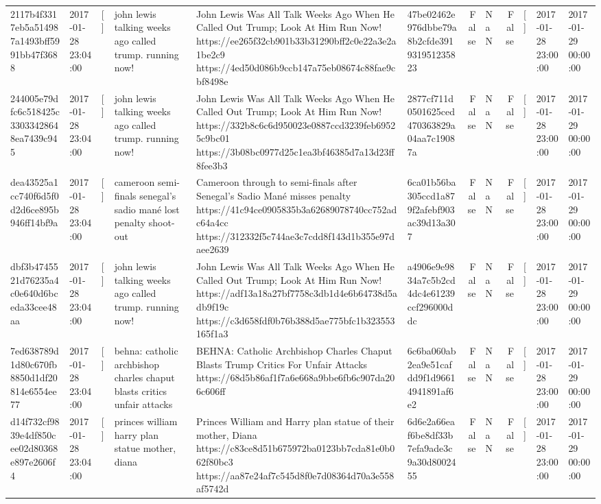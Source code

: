 \begin{tabular}{llllllrlrlll}
2117b4f3317eb5a514987a1493bff5991bb47f3688 & 2017-01-28 23:04:00 & [] & john lewis talking weeks ago called trump. running now! & John Lewis Was All Talk Weeks Ago When He Called Out Trump; Look At Him Run Now! https://ee265f32cb901b33b31290bff2c0e22a3e2a1be2c9 https://4ed50d086b9ccb147a75eb08674c88fae9cbf8498e & 47be02462e976dbbe79a8b2cfde391931951235823 & False & NaN & False & [] & 2017-01-28 23:00:00 & 2017-01-29 00:00:00 \\
244005e79dfc6c518425c33033428648ea7439c945 & 2017-01-28 23:04:00 & [] & john lewis talking weeks ago called trump. running now! & John Lewis Was All Talk Weeks Ago When He Called Out Trump; Look At Him Run Now! https://332b8c6c6d950023e0887ccd3239feb69525c9bc01 https://3b08bc0977d25c1ea3bf46385d7a13d23ff8fee3b3 & 2877cf711d0501625ced470363829a04aa7c19087a & False & NaN & False & [] & 2017-01-28 23:00:00 & 2017-01-29 00:00:00 \\
dea43525a1cc740f6d5f0d2d6ce895b946ff14bf9a & 2017-01-28 23:04:00 & [] & cameroon semi-finals senegal's sadio mané lost penalty shoot-out & Cameroon through to semi-finals after Senegal’s Sadio Mané misses penalty https://41c94ce0905835b3a62689078740cc752adc64a4cc https://312332f5c744ae3c7cdd8f143d1b355e97daee2639 & 6ca01b56ba305ccd1a879f2afebf903ac39d13a307 & False & NaN & False & [] & 2017-01-28 23:00:00 & 2017-01-29 00:00:00 \\
dbf3b4745521d76235a4c0e640d6bceda33cee48aa & 2017-01-28 23:04:00 & [] & john lewis talking weeks ago called trump. running now! & John Lewis Was All Talk Weeks Ago When He Called Out Trump; Look At Him Run Now! https://adf13a18a27bf7758c3db1d4e6b64738d5adb9f19c https://c3d658fdf0b76b388d5ae775bfc1b323553165f1a3 & a4906e9e9834a7c5b2cd4dc4e61239ccf296000ddc & False & NaN & False & [] & 2017-01-28 23:00:00 & 2017-01-29 00:00:00 \\
7ed638789d1d80c670fb8850d1df20814e6554ee77 & 2017-01-28 23:04:00 & [] & behna: catholic archbishop charles chaput blasts critics unfair attacks & BEHNA: Catholic Archbishop Charles Chaput Blasts Trump Critics For Unfair Attacks https://68d5b86af1f7a6e668a9bbe6fb6c907da206c606ff & 6c6ba060ab2ea9e51cafdd9f1d96614941891af6e2 & False & NaN & False & [] & 2017-01-28 23:00:00 & 2017-01-29 00:00:00 \\
d14f732cf9839e4df850cee02d80368e897e2606f4 & 2017-01-28 23:04:00 & [] & princes william harry plan statue mother, diana & Princes William and Harry plan statue of their mother, Diana https://c83ce8d51b675972ba0123bb7cda81e0b062f80bc3 https://aa87e24af7c545d8f0e7d08364d70a3e558af5742d & 6d6e2a66eaf6be8df33b7efa9ade3c9a30d8002455 & False & NaN & False & [] & 2017-01-28 23:00:00 & 2017-01-29 00:00:00 \\

\end{tabular}
